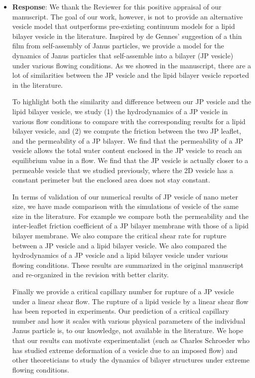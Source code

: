 \documentclass[11pt]{article}
\begin{document}
\begin{itemize}
  \item {\bf Response}: We thank the Reviewer for this positive appraisal of our manuscript.  
    The goal of our work, however, is not to provide an alternative vesicle model that outperforms
    pre-existing continuum models for a lipid bilayer vesicle in the literature.
    Inspired by de Gennes' suggestion of a thin film from self-assembly of Janus particles,
    we provide a model for the dynamics of Janus particles that self-assemble into a bilayer
    (JP vesicle) under various flowing conditions. 
    As we showed in the manuscript, there are a lot of similarities between the
    JP vesicle and the lipid bilayer vesicle reported in the literature.

To highlight both the similarity and difference between our JP vesicle and the lipid bilayer vesicle, we study (1) the hydrodynamics of a JP vesicle in various flow conditions to compare with the corresponding results for a lipid bilayer vesicle,
and (2) we compute the friction between the two JP leaflet, and the permeability of a JP bilayer. We find that the permeability of a JP vesicle allows the total water content enclosed in the JP vesicle to reach an equilibrium value in a flow. We find that the JP vesicle is actually closer to a permeable vesicle that we studied previously, where the 2D vesicle has a constant perimeter but the enclosed area does not stay constant.

In terms of validation of our numerical results of JP vesicle of nano meter size, we have made comparison with the simulations of vesicle of the same size in the literature. For example we compare both the permeability and the inter-leaflet friction coefficient of a JP bilayer membrane with those of a lipid bilayer membrane. We also compare the critical shear rate for rupture between a JP vesicle and a lipid bilayer vesicle. We also compared the hydrodynamics of a JP vesicle and a lipid bilayer vesicle under various flowing conditions. These results are summarized in the original manuscript and re-organized in the revision with better clarity. 

Finally we provide a critical capillary number for rupture of a JP vesicle under a linear shear flow. The rupture of a lipid vesicle by a linear shear flow has been reported in experiments.  Our prediction of a critical capillary number and how it scales with various physical parameters of the individual Janus particle is, to our knowledge, not available in the literature. We hope that our results can motivate experimentalist (such as Charles Schroeder who has studied extreme deformation of a vesicle due to an imposed flow) and other theoreticians to study the dynamics of bilayer structures under extreme flowing conditions.
 
\end{itemize}
\end{document}
